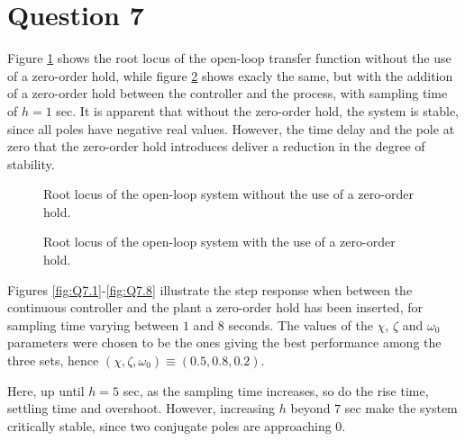 \section{Question 7}

Figure \ref{fig:Q7.rloc_F_G} shows the root locus of the open-loop transfer
function without the use of a zero-order hold, while figure
\ref{fig:Q7.rloc_F_ZOH_G} shows exacly the same, but with the addition of a
zero-order hold between the controller and the process, with sampling time of
$h=1$ sec. It is apparent that without the zero-order hold, the system is stable,
since all poles have negative real values. However, the time delay and the pole
at zero that the zero-order hold introduces deliver a reduction in the degree of
stability.

\begin{figure}[H]\centering
	\centering
	\scalebox{1}{}
  \caption{Root locus of the open-loop system without the use of a zero-order hold.}
  \label{fig:Q7.rloc_F_G}
\end{figure}

\begin{figure}[H]\centering
	\centering
	\scalebox{1}{}
  \caption{Root locus of the open-loop system with the use of a zero-order hold.}
  \label{fig:Q7.rloc_F_ZOH_G}
\end{figure}

Figures \ref{fig:Q7.1}-\ref{fig:Q7.8} illustrate the step response when between
the continuous controller and the plant a zero-order hold has been inserted, for
sampling time varying between $1$ and $8$ seconds. The values of the $\chi$,
$\zeta$ and $\omega_0$ parameters were chosen to be the ones giving the best
performance among the three sets,
hence $(\chi, \zeta, \omega_0) \equiv (0.5, 0.8, 0.2)$.

Here, up until $h = 5$ sec, as the sampling time increases, so do the rise
time, settling time and overshoot. However, increasing $h$ beyond $7$ sec
make the system critically stable, since two conjugate poles are approaching
$0$.



\noindent{}

